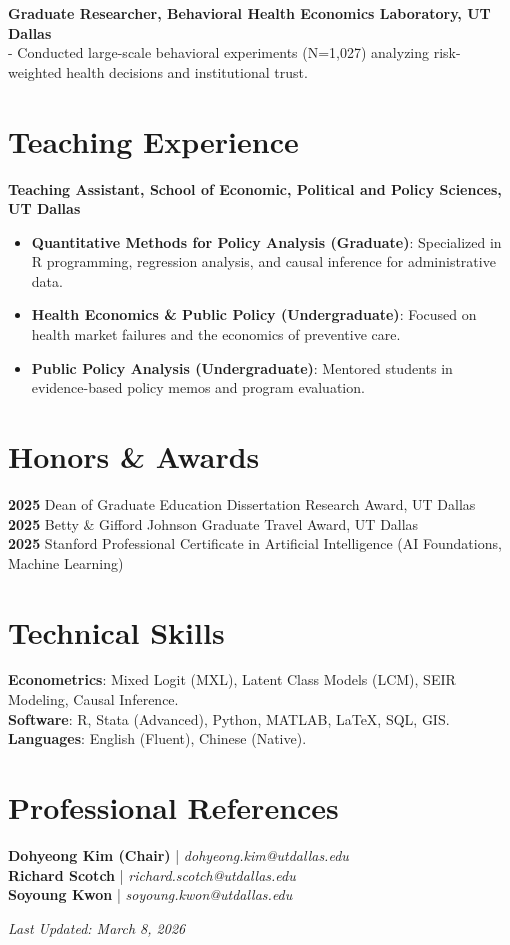 \documentclass[11pt]{article}
\begin{document}
\vspace{0.5em}
\noindent \textbf{Graduate Researcher, Behavioral Health Economics Laboratory, UT Dallas} \\
- Conducted large-scale behavioral experiments (N=1,027) analyzing risk-weighted health decisions and institutional trust.

\section*{Teaching Experience}
\textbf{Teaching Assistant, School of Economic, Political and Policy Sciences, UT Dallas}
\begin{itemize}[noitemsep, topsep=0pt]
    \item \textbf{Quantitative Methods for Policy Analysis (Graduate)}: Specialized in R programming, regression analysis, and causal inference for administrative data.
    \item \textbf{Health Economics \& Public Policy (Undergraduate)}: Focused on health market failures and the economics of preventive care.
    \item \textbf{Public Policy Analysis (Undergraduate)}: Mentored students in evidence-based policy memos and program evaluation.
\end{itemize}

\section*{Honors \& Awards}
\textbf{2025} \quad Dean of Graduate Education Dissertation Research Award, UT Dallas \\
\textbf{2025} \quad Betty \& Gifford Johnson Graduate Travel Award, UT Dallas \\
\textbf{2025} \quad Stanford Professional Certificate in Artificial Intelligence (AI Foundations, Machine Learning)

\section*{Technical Skills}
\textbf{Econometrics}: Mixed Logit (MXL), Latent Class Models (LCM), SEIR Modeling, Causal Inference. \\
\textbf{Software}: R, Stata (Advanced), Python, MATLAB, LaTeX, SQL, GIS. \\
\textbf{Languages}: English (Fluent), Chinese (Native).

\section*{Professional References}
\textbf{Dohyeong Kim (Chair)} | \textit{dohyeong.kim@utdallas.edu} \\
\textbf{Richard Scotch} | \textit{richard.scotch@utdallas.edu} \\
\textbf{Soyoung Kwon} | \textit{soyoung.kwon@utdallas.edu}

\vspace{1em}
\begin{center}
    \textit{Last Updated: March 8, 2026}
\end{center}
\end{document}
